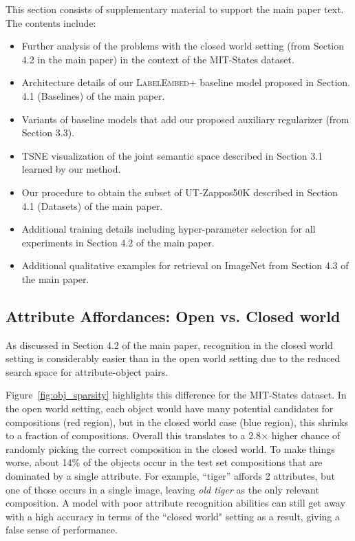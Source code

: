 \documentclass[runningheads]{llncs}
\newcommand{\SC}[1]{{\textsc{#1}}}
\newcommand{\reffig}[1]{Figure~\ref{#1}}
\begin{document}
This section consists of supplementary material to support the main paper text. The contents include:
\begin{itemize}
	\item Further analysis of the problems with the closed world setting (from Section 4.2 in the main paper) in the context of the MIT-States dataset.
	\item Architecture details of our \SC{LabelEmbed+} baseline model proposed in Section. 4.1 (Baselines) of the main paper.
	\item Variants of baseline models that add our proposed auxiliary regularizer (from Section 3.3).
      \item TSNE visualization of the joint semantic space described in Section 3.1 learned by our method.
	\item Our procedure to obtain the subset of UT-Zappos50K described in Section 4.1 (Datasets) of the main paper.
	\item Additional training details including hyper-parameter selection for all experiments in Section 4.2 of the main paper.

	\item Additional qualitative examples for retrieval on ImageNet from Section 4.3 of the main paper.
	
\end{itemize}

\subsection*{Attribute Affordances: Open vs. Closed world}
As discussed in Section 4.2 of the main paper, recognition in the closed world setting is considerably easier than in the open world setting due to the reduced search space for attribute-object pairs. 

\reffig{fig:obj_sparsity} highlights this difference for the MIT-States dataset. In the open world setting, each object would have many potential candidates for compositions (red region), but in the closed world case (blue region), this shrinks to a fraction of compositions. Overall this translates to a 2.8$\times$ higher chance of randomly picking the correct composition in the closed world.  
To make things worse, about 14\% of the objects occur in the test set compositions that are dominated by a single attribute. For example, ``tiger'' affords 2 attributes, but one of those occurs in a single image, leaving \emph{old tiger} as the only relevant composition. A model with poor attribute recognition abilities can still get away with a high accuracy  in terms of the ``closed world" setting as a result, giving a false sense of performance.
\end{document}
